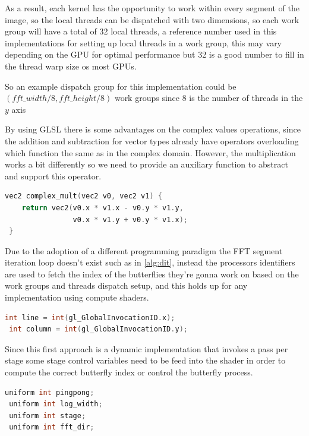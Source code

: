 \documentclass[
  oneside,
  11pt, a4paper,
  footinclude=true,
  headinclude=true,
  cleardoublepage=empty
]{scrbook}
\begin{document}
As a result, each kernel has the opportunity to work within every segment of the image, so the local threads can be dispatched with two dimensions, so each work group will have a total of 32 local threads, a reference number used in this implementations for setting up local threads in a work group, this may vary depending on the GPU for optimal performance but 32 is a good number to fill in the thread warp size os most GPUs.

So an example dispatch group for this implementation could be $(fft\_width/8,fft\_height/8)$ work groups since 8 is the number of threads in the $y$ axis

By using GLSL there is some advantages on the complex values operations, since the addition and subtraction for vector types already have operators overloading which function the same as in the complex domain. However, the multiplication works a bit differently so we need to provide an auxiliary function to abstract and support this operator.

\begin{lstlisting}[language=C, caption={Complex multiplication}]
 vec2 complex_mult(vec2 v0, vec2 v1) {
 	return vec2(v0.x * v1.x - v0.y * v1.y,
 				v0.x * v1.y + v0.y * v1.x);
 }
\end{lstlisting}

Due to the adoption of a different programming paradigm the FFT segment iteration loop doesn't exist such as in \autoref{alg:dit}, instead the processors identifiers are used to fetch the index of the butterflies they're gonna work on based on the work groups and threads dispatch setup, and this holds up for any implementation using compute shaders.

\begin{lstlisting}[language=C, caption={Invocation indices}]
 int line = int(gl_GlobalInvocationID.x);
 int column = int(gl_GlobalInvocationID.y);
\end{lstlisting}

Since this first approach is a dynamic implementation that invokes a pass per stage some stage control variables need to be feed into the shader in order to compute the correct butterfly index or control the butterfly process.

\begin{lstlisting}[language=C, caption={Uniform control variables}]
 uniform int pingpong;
 uniform int log_width;
 uniform int stage;
 uniform int fft_dir;
\end{lstlisting}
\end{document}
